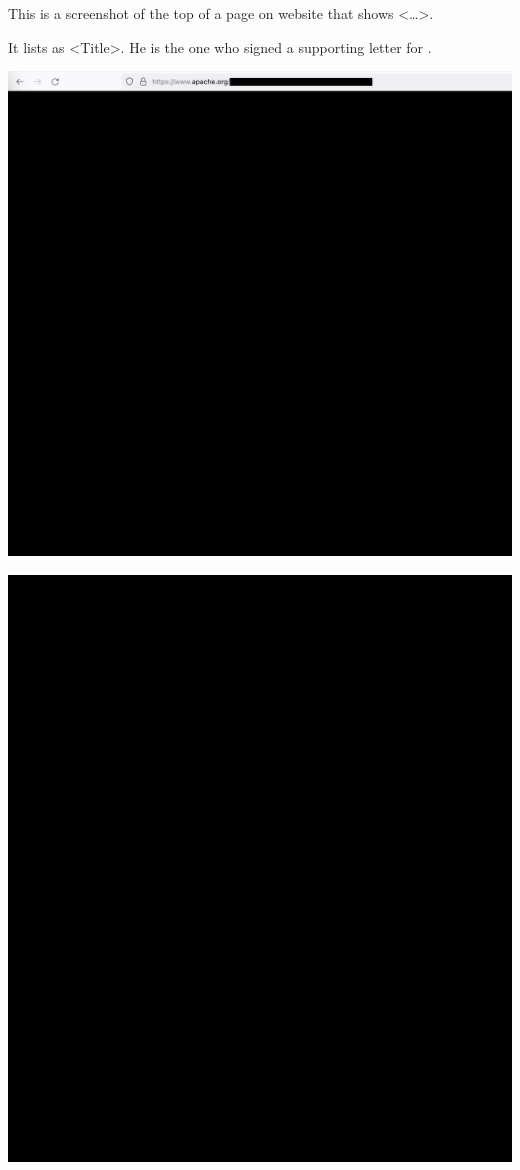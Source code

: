 
This is a screenshot of the top of a page on \Asf website that shows <\dots>.

It lists \MrApache as <Title>.
He is the one who signed a supporting letter for \mrl.

\includegraphics[width=\textwidth]{apache-roles-p1_public}
\WillContinue
\pagebreak

\Continuing
\includegraphics[width=\textwidth]{apache-roles-p2_public}
\WillContinue
\pagebreak

